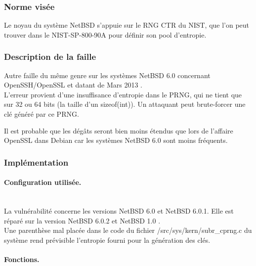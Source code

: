 		\subsubsection{Norme visée}
		
			Le noyau du système NetBSD s'appuie sur le RNG CTR du NIST, que
			l'on peut trouver dans le NIST-SP-800-90A \cite{nist800-90A} pour
			définir son pool d'entropie.	
		
		\subsubsection{Description de la faille}
		
			Autre faille du même genre sur les systèmes NetBSD 6.0 
			concernant OpenSSH/OpenSSL et datant de Mars 2013
			\cite{alerteBSD2013} \cite{failleNetBSDPatrick}. \\
		
			L'erreur provient d'une insuffisance d'entropie dans le PRNG,
			qui ne tient que sur 32 ou 64 bits (la taille d'un sizeof(int)).
			Un attaquant peut brute-forcer une clé généré par ce PRNG.
		
			Il est probable que les dégâts seront bien moins étendus que 
			lors de l'affaire OpenSSL dans Debian car les systèmes 
			NetBSD 6.0 sont moins fréquents.\\
			
		\subsubsection{Implémentation}
			
			\paragraph{Configuration utilisée.} \\
			
			La vulnérabilité concerne les versions NetBSD 6.0 et NetBSD 6.0.1.
			Elle est réparé sur la version NetBSD 6.0.2 et NetBSD 1.0 
			\cite{diffNetBSD}.\\
			
			Une parenthèse mal placée dans le code du fichier 
			/src/sys/kern/subr\_cprng.c du système rend prévisible l'entropie
			fourni pour la génération des clés.\\
			
			\paragraph{Fonctions.} \\
			
